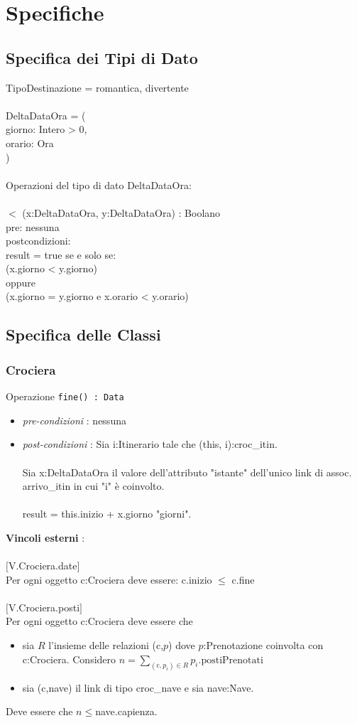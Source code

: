 \documentclass[12pt, letterpaper]{article}
\newcommand{\acc}{\\\hphantom{}\\}
\newcommand{\code}[1]{\colorbox{light-gray}{\texttt{#1}}}
\begin{document}
\section{Specifiche}
\subsection{Specifica dei Tipi di Dato}
TipoDestinazione = {romantica, divertente}\acc
DeltaDataOra = (\\
\hphantom{ident}giorno: Intero > 0,\\
\hphantom{ident}orario: Ora	\\
)\acc
Operazioni del tipo di dato DeltaDataOra:\acc
\hphantom{ident}$<$ (x:DeltaDataOra, y:DeltaDataOra) : Boolano\\
\hphantom{ident}\hphantom{ident}pre: nessuna\\
\hphantom{ident}\hphantom{ident}postcondizioni:\\
\hphantom{ident}\hphantom{ident}result = true se e solo se:\\
\hphantom{ident}\hphantom{ident}(x.giorno < y.giorno)\\
\hphantom{ident}\hphantom{ident}oppure\\
\hphantom{ident}\hphantom{ident}(x.giorno = y.giorno e x.orario < y.orario)
\subsection{Specifica delle Classi}
\subsubsection{Crociera}
Operazione \code{fine() : Data}\begin{itemize}
    \item \textit{pre-condizioni} : nessuna 
    \item \textit{post-condizioni} : Sia i:Itinerario tale che (this, i):croc\_itin.\acc
    Sia x:DeltaDataOra il valore dell'attributo "istante" dell'unico link di assoc.
    arrivo\_itin in cui "i" è coinvolto.\acc
    result = this.inizio + x.giorno "giorni".
\end{itemize}
\textbf{Vincoli esterni} :\acc
$[$V.Crociera.date$]$\\
\hphantom{ident}Per ogni oggetto c:Crociera deve essere: c.inizio $\le$ c.fine\acc 
$[$V.Crociera.posti$]$\\
\hphantom{ident}Per ogni oggetto c:Crociera deve essere che\begin{itemize}
    \item  sia $R$ l'insieme delle relazioni (c,$p$) dove 
$p$:Prenotazione coinvolta con c:Crociera. Considero $n=\displaystyle\sum_{(\text{c},p_i)\in R}p_i.\text{postiPrenotati}$
\item sia (c,nave) il link di tipo croc\_nave e sia nave:Nave.
\end{itemize}
\hphantom{ident} Deve essere che $n\le$nave.capienza.
\end{document}
